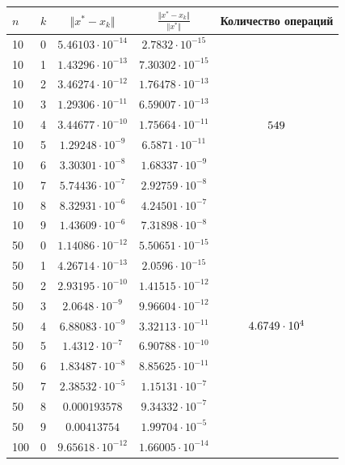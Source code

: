 \documentclass[english]{article}
\begin{document}
\begin{center}
  \begin{longtable}{l|l|c|c|c}
    \(n\) & \(k\) & \(\Vert x^* - x_k \Vert\) & \(\frac{\Vert x^* - x_k \Vert}{\Vert x^* \Vert}\) & Количество операций\\
    \hline
    10 & 0 & \(5.46103\cdot 10^{-14} \)& \(2.7832\cdot 10^{-15}\) & \\
    10 & 1 & \(1.43296\cdot 10^{-13} \)& \(7.30302\cdot 10^{-15}\) & \\
    10 & 2 & \(3.46274\cdot 10^{-12} \)& \(1.76478\cdot 10^{-13}\) & \\
    10 & 3 & \(1.29306\cdot 10^{-11} \)& \(6.59007\cdot 10^{-13}\) & \\
    10 & 4 & \(3.44677\cdot 10^{-10} \)& \(1.75664\cdot 10^{-11}\) & \({\large 549}\) \\
    10 & 5 & \(1.29248\cdot 10^{-9} \)& \(6.5871\cdot 10^{-11}\) & \\
    10 & 6 & \(3.30301\cdot 10^{-8} \)& \(1.68337\cdot 10^{-9}\) & \\
    10 & 7 & \(5.74436\cdot 10^{-7} \)& \(2.92759\cdot 10^{-8}\) & \\
    10 & 8 & \(8.32931\cdot 10^{-6} \)& \(4.24501\cdot 10^{-7}\) & \\
    10 & 9 & \(1.43609\cdot 10^{-6} \)& \(7.31898\cdot 10^{-8}\) & \\
    \hline
    50 & 0 & \(1.14086\cdot 10^{-12} \)& \(5.50651\cdot 10^{-15}\) & \\
    50 & 1 & \(4.26714\cdot 10^{-13} \)& \(2.0596\cdot 10^{-15}\) & \\
    50 & 2 & \(2.93195\cdot 10^{-10} \)& \(1.41515\cdot 10^{-12}\) & \\
    50 & 3 & \(2.0648\cdot 10^{-9}  \)& \(9.96604\cdot 10^{-12}\) & \\
    50 & 4 & \(6.88083\cdot 10^{-9} \)& \(3.32113\cdot 10^{-11}\) & \({\large 4.6749 \cdot 10^4}\) \\
    50 & 5 & \(1.4312\cdot 10^{-7}  \)& \(6.90788\cdot 10^{-10}\) & \\
    50 & 6 & \(1.83487\cdot 10^{-8} \)& \(8.85625\cdot 10^{-11}\) & \\
    50 & 7 & \(2.38532\cdot 10^{-5} \)& \(1.15131\cdot 10^{-7}\) & \\
    50 & 8 & \(0.000193578 \)& \(9.34332\cdot 10^{-7}\) & \\
    50 & 9 & \(0.00413754  \)& \(1.99704\cdot 10^{-5}\) & \\
    \hline
    100 & 0 & \(9.65618\cdot 10^{-12} \)& \(1.66005\cdot 10^{-14}\) & \\

\end{longtable}
\end{center}
\end{document}
